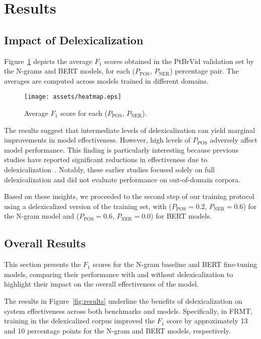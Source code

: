 \section{Results}
\label{sec:results}

\subsection{Impact of Delexicalization}
\label{subsec:hyper}

Figure~\ref{fig:hyperparameters_ngrams} depicts the average $F_1$ scores obtained in the PtBrVid validation set by the N-grams and BERT models, for each ($P_\text{POS}$, $P_\text{NER}$) percentage pair. The averages are computed across models trained in different domains.

\begin{figure}[ht]
    \centering
    \texttt{[image: assets/heatmap.eps]}
    \caption{Average $F_1$ score for each ($P_\text{POS}$, $P_\text{NER}$).}
    \label{fig:hyperparameters_ngrams}
\end{figure}


The results suggest that intermediate levels of delexicalization can yield marginal improvements in model effectiveness. However, high levels of $P_\text{POS}$ adversely affect model performance. This finding is particularly interesting because previous studies have reported significant reductions in effectiveness due to delexicalization~\cite{sharoff2010web,lui2014exploring}. Notably, these earlier studies focused solely on full delexicalization and did not evaluate performance on out-of-domain corpora.

Based on these insights, we proceeded to the second step of our training protocol using a delexicalized version of the training set, with ($P_\text{POS}=0.2$, $P_\text{NER}=0.6$) for the N-gram model and ($P_\text{POS}=0.6$, $P_\text{NER}=0.0$) for BERT models.


\subsection{Overall Results}

This section presents the $F_1$ scores for the N-gram baseline and BERT fine-tuning models, comparing their performance with and without delexicalization to highlight their impact on the overall effectiveness of the model.

The results in Figure~\ref{fig:results} underline the benefits of delexicalization on system effectiveness across both benchmarks and models. Specifically, in FRMT, training in the delexicalized corpus improved the $F_1$ score by approximately 13 and 10 percentage points for the N-gram and BERT models, respectively. 

